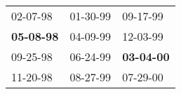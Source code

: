 \begin{supertabular}{p{0.33\columnwidth}p{0.33\columnwidth}p{0.33\columnwidth}}
          02-07-98\textsuperscript{} &  01-30-99\textsuperscript{} &           09-17-99\textsuperscript{} \\
 \textbf{05-08-98\textsuperscript{}} &  04-09-99\textsuperscript{} &           12-03-99\textsuperscript{} \\
          09-25-98\textsuperscript{} &  06-24-99\textsuperscript{} &  \textbf{03-04-00\textsuperscript{}} \\
          11-20-98\textsuperscript{} &  08-27-99\textsuperscript{} &           07-29-00\textsuperscript{} \\
\end{supertabular}
